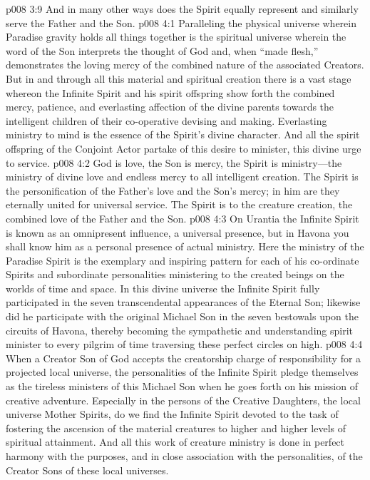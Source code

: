 \vs p008 3:9 And in many other ways does the Spirit equally represent and similarly serve the Father and the Son.
\vs p008 4:1 Paralleling the physical universe wherein Paradise gravity holds all things together is the spiritual universe wherein the word of the Son interprets the thought of God and, when “made flesh,” demonstrates the loving mercy of the combined nature of the associated Creators. But in and through all this material and spiritual creation there is a vast stage whereon the Infinite Spirit and his spirit offspring show forth the combined mercy, patience, and everlasting affection of the divine parents towards the intelligent children of their co\hyp{}operative devising and making. Everlasting ministry to mind is the essence of the Spirit’s divine character. And all the spirit offspring of the Conjoint Actor partake of this desire to minister, this divine urge to service.
\vs p008 4:2 God is love, the Son is mercy, the Spirit is ministry---the ministry of divine love and endless mercy to all intelligent creation. The Spirit is the personification of the Father’s love and the Son’s mercy; in him are they eternally united for universal service. The Spirit is  to the creature creation, the combined love of the Father and the Son.
\vs p008 4:3 On Urantia the Infinite Spirit is known as an omnipresent influence, a universal presence, but in Havona you shall know him as a personal presence of actual ministry. Here the ministry of the Paradise Spirit is the exemplary and inspiring pattern for each of his co\hyp{}ordinate Spirits and subordinate personalities ministering to the created beings on the worlds of time and space. In this divine universe the Infinite Spirit fully participated in the seven transcendental appearances of the Eternal Son; likewise did he participate with the original Michael Son in the seven bestowals upon the circuits of Havona, thereby becoming the sympathetic and understanding spirit minister to every pilgrim of time traversing these perfect circles on high.
\pc \vs p008 4:4 When a Creator Son of God accepts the creatorship charge of responsibility for a projected local universe, the personalities of the Infinite Spirit pledge themselves as the tireless ministers of this Michael Son when he goes forth on his mission of creative adventure. Especially in the persons of the Creative Daughters, the local universe Mother Spirits, do we find the Infinite Spirit devoted to the task of fostering the ascension of the material creatures to higher and higher levels of spiritual attainment. And all this work of creature ministry is done in perfect harmony with the purposes, and in close association with the personalities, of the Creator Sons of these local universes.
